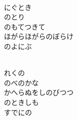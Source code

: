 \documentclass[10pt,b5j]{tarticle} %
\begin{document}
\begin{enumerate}
\begin{minipage}[c]{\blocksize}
        \vspace{\linespace}
        \item~\\
        にぐとき\\
        のとり\\
        のもてつきて\\
        ほがらほがらのぼらけ\\
        のよにぶ
        
        \vspace{\linespace}
        \item~\\
        れくの\\
        のべのかな\\
        かへらぬをしのびつつ\\
        のときしも\\
        すでにの
    
    \end{minipage}
\end{enumerate} %
\end{document}
